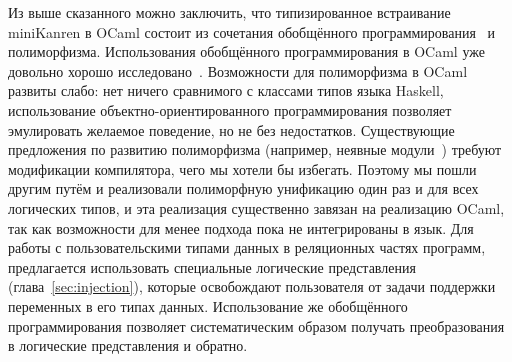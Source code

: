 Из выше сказанного можно заключить, что типизированное встраивание miniKanren в OCaml состоит из сочетания обобщённого программирования~\cite{DGP} и \adhoc{}  полиморфизма.
Использования обобщённого программирования в OCaml уже довольно хорошо исследовано~\cite{Deriving}.
Возможности для \adhoc{} полиморфизма в OCaml развиты слабо: нет ничего сравнимого с классами типов языка Haskell, использование объектно-ориентированного программирования позволяет эмулировать желаемое поведение, но не без недостатков.
Существующие предложения по развитию \adhoc{} полиморфизма (например, неявные модули~\cite{Implicits}) требуют модификации компилятора, чего мы хотели бы избегать.
Поэтому мы пошли другим путём и реализовали полиморфную унификацию один раз и для всех логических типов, и эта реализация существенно завязан на реализацию OCaml,
так как возможности для менее \adhoc{} подхода пока не интегрированы в язык.
Для работы с пользовательскими типами данных в реляционных частях программ, предлагается использовать специальные логические представления (глава~\ref{sec:injection}), которые освобождают пользователя от задачи поддержки переменных в его типах данных.
Использование же обобщённого программирования позволяет систематическим образом получать преобразования в логические представления и обратно.

%
%
%
